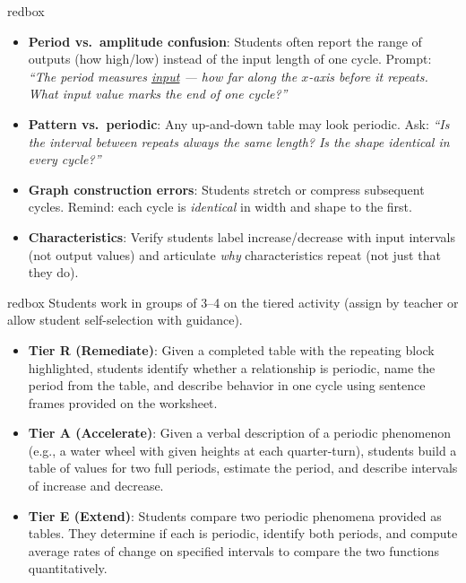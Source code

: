 \documentclass[10pt]{article}
\begin{document}
\vspace{0.08in}

\begin{skillbox}{redbox}
\begin{itemize}[leftmargin=1.4em, itemsep=3pt]
  \item \textbf{Period vs.\ amplitude confusion}: Students often report the
    range of outputs (how high/low) instead of the input length of one cycle.
    Prompt: \textit{``The period measures \underline{input} --- how far along
    the $x$-axis before it repeats. What input value marks the end of one cycle?''}
  \item \textbf{Pattern vs.\ periodic}: Any up-and-down table may look periodic.
    Ask: \textit{``Is the interval between repeats always the same length?
    Is the shape identical in every cycle?''}
  \item \textbf{Graph construction errors}: Students stretch or compress
    subsequent cycles. Remind: each cycle is \emph{identical} in width and
    shape to the first.
  \item \textbf{Characteristics}: Verify students label increase/decrease with
    input intervals (not output values) and articulate \emph{why} characteristics
    repeat (not just that they do).
\end{itemize}
\end{skillbox}

\vspace{0.08in}

\begin{skillbox}{redbox}
Students work in groups of 3--4 on the tiered activity (assign by teacher
or allow student self-selection with guidance).

\begin{itemize}[leftmargin=1.4em, itemsep=4pt]
  \item \textbf{Tier R (Remediate)}: Given a completed table with the
    repeating block highlighted, students identify whether a relationship
    is periodic, name the period from the table, and describe behavior in
    one cycle using sentence frames provided on the worksheet.
  \item \textbf{Tier A (Accelerate)}: Given a verbal description of a periodic
    phenomenon (e.g., a water wheel with given heights at each quarter-turn),
    students build a table of values for two full periods, estimate the period,
    and describe intervals of increase and decrease.
  \item \textbf{Tier E (Extend)}: Students compare two periodic phenomena
    provided as tables. They determine if each is periodic, identify both
    periods, and compute average rates of change on specified intervals to
    compare the two functions quantitatively.
\end{itemize}
\end{skillbox}
\end{document}
